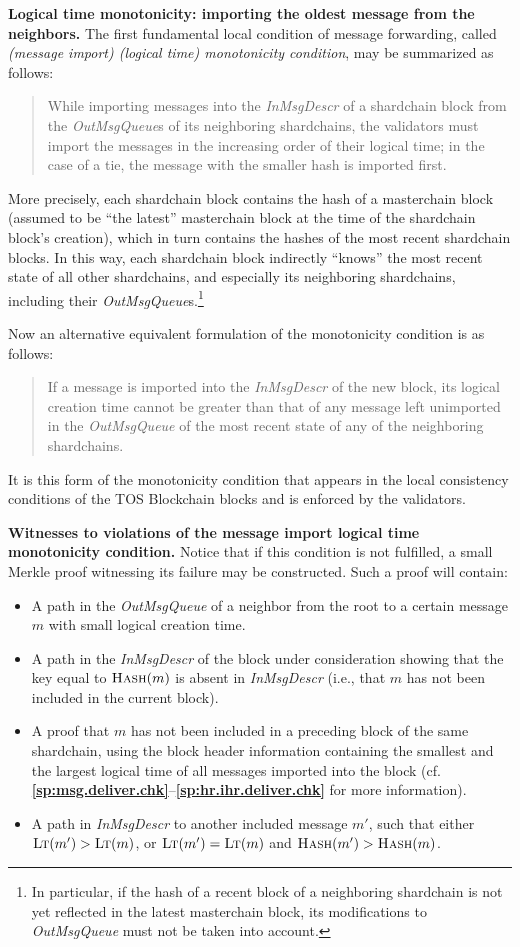 \documentclass[12pt,oneside]{article}
\def\makepoint#1{\medbreak\noindent{\bf #1.\ }}
\def\nxsubpoint{\refstepcounter{subsubsection}%
  \smallbreak\makepoint{\thesubsubsection}}
\def\refpoint#1{{\rm\textbf{\ref{#1}}}}
\let\ptref=\refpoint
\def\emb#1{\textbf{#1.}}
\def\opsc#1{\operatorname{\textsc{#1}}}
\def\Hash{\opsc{Hash}}
\def\LT{\opsc{Lt}}
\begin{document}
\nxsubpoint\label{sp:monot.import}
\emb{Logical time monotonicity: importing the oldest message from the neighbors}
The first fundamental local condition of message forwarding, called {\em (message import) (logical time) monotonicity condition}, may be summarized as follows:
\begin{quote}
 While importing messages into the {\em InMsgDescr\/} of a shardchain block from the {\em OutMsgQueue\/}s of its neighboring shardchains, the validators must import the messages in the increasing order of their logical time; in the case of a tie, the message with the smaller hash is imported first.
\end{quote}
More precisely, each shardchain block contains the hash of a masterchain block (assumed to be ``the latest'' masterchain block at the time of the shardchain block's creation), which in turn contains the hashes of the most recent shardchain blocks. In this way, each shardchain block indirectly ``knows'' the most recent state of all other shardchains, and especially its neighboring shardchains, including their {\em OutMsgQueue\/}s.\footnote{In particular, if the hash of a recent block of a neighboring shardchain is not yet reflected in the latest masterchain block, its modifications to {\em OutMsgQueue\/} must not be taken into account.}

Now an alternative equivalent formulation of the monotonicity condition is as follows:
\begin{quote}
If a message is imported into the {\em InMsgDescr\/} of the new block, its logical creation time cannot be greater than that of any message left unimported in the {\em OutMsgQueue\/} of the most recent state of any of the neighboring shardchains.
\end{quote}
It is this form of the monotonicity condition that appears in the local consistency conditions of the TOS Blockchain blocks and is enforced by the validators.

\nxsubpoint\emb{Witnesses to violations of the message import logical time monotonicity condition}
Notice that if this condition is not fulfilled, a small Merkle proof witnessing its failure may be constructed. Such a proof will contain:
\begin{itemize}
\item A path in the {\em OutMsgQueue\/} of a neighbor from the root to a certain message $m$ with small logical creation time.
\item A path in the {\em InMsgDescr\/} of the block under consideration showing that the key equal to $\Hash(m)$ is absent in {\em InMsgDescr} (i.e., that $m$ has not been included in the current block).
\item A proof that $m$ has not been included in a preceding block of the same shardchain, using the block header information containing the smallest and the largest logical time of all messages imported into the block (cf. \ptref{sp:msg.deliver.chk}--\ptref{sp:hr.ihr.deliver.chk} for more information).
\item A path in {\em InMsgDescr\/} to another included message $m'$, such that either $\LT(m')>\LT(m)$, or $\LT(m')=\LT(m)$ and $\Hash(m')>\Hash(m)$.
\end{itemize}
\end{document}
